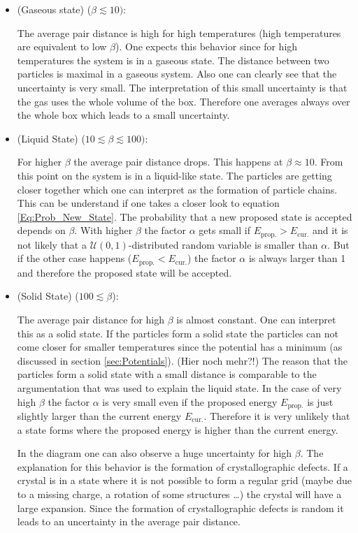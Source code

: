 \documentclass[11pt, a4paper]{article}
\numberwithin{equation}{section}
\newcommand{\remark}[1]{{\color{red}(#1)}}
\begin{document}
\begin{itemize}
\item{\remark{Gaseous state} ($\beta \lesssim 10)$:}

The average pair distance is high for high temperatures (high temperatures are equivalent to low $\beta$).
One expects this behavior since for high temperatures the system is in a gaseous state.
The distance between two particles is maximal in a gaseous system.
Also one can clearly see that the uncertainty is very small.
The interpretation of this small uncertainty is that the gas uses the whole volume of the box.
Therefore one averages always over the whole box which leads to a small uncertainty.

\item{\remark{Liquid State} ($10 \lesssim \beta \lesssim 100)$:}

For higher $\beta$ the average pair distance drops.
This happens at $\beta \approx 10$.
From this point on the system is in a liquid-like state.
The particles are getting closer together which one can interpret as the formation of particle chains.
This can be understand if one takes a closer look to equation \ref{Eq:Prob_New_State}.
The probability that a new proposed state is accepted depends on $\beta$.
With higher $\beta$ the factor $\alpha$ gets small if $E_\mathrm{prop.} > E_\mathrm{cur.}$ and it is not likely that a $\mathcal{U}(0, 1)$-distributed random variable is smaller than $\alpha$.
But if the other case happens ($E_\mathrm{prop.} < E_\mathrm{cur.}$) the factor $\alpha$ is always larger than 1 and therefore the proposed state will be accepted.

\item{\remark{Solid State} ($100 \lesssim \beta$):}

The average pair distance for high $\beta$ is almost constant.
One can interpret this as a solid state.
If the particles form a solid state the particles can not come closer for smaller temperatures since the potential has a minimum (as discussed in section \ref{sec:Potentials}). \remark{Hier noch mehr?!}
The reason that the particles form a solid state with a small distance is comparable to the argumentation that was used to explain the liquid state.
In the case of very high $\beta$ the factor $\alpha$ is very small even if the proposed energy $E_\mathrm{prop.}$ is just slightly larger than the current energy $E_\mathrm{cur.}$.
Therefore it is very unlikely that a state forms where the proposed energy is higher than the current energy.

In the diagram one can also observe a huge uncertainty for high $\beta$.
The explanation for this behavior is the formation of crystallographic defects.
If a crystal is in a state where it is not possible to form a regular grid (maybe due to a missing charge, a rotation of some structures \dots) the crystal will have a large expansion.
Since the formation of crystallographic defects is random it leads to an uncertainty in the average pair distance.
\end{itemize}
\end{document}
